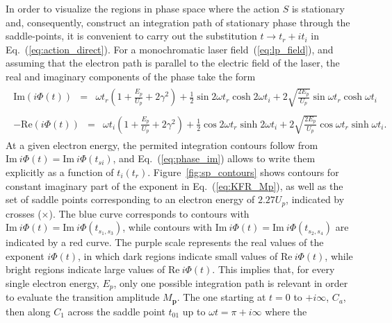 In order to visualize the regions in phase space where the action $S$
is stationary and, consequently, construct an integration path of
stationary phase through the saddle-points, it is convenient to carry
out the substitution $t \to t_{r} + it_{i}$ in
Eq.~(\ref{eq:action_direct}). For a monochromatic laser
field~(\ref{eq:lp_field}), and assuming that the electron path is
parallel to the electric field of the laser, the real and imaginary
components of the phase take the form~\cite{phd_Kopold}
%
\begin{eqnarray}
  \label{eq:phase_im}
  \begin{split}
    \mathrm{Im}(i\Phi(t)) & = & \omega t_{r} ( 1 + \frac{E_{p}}{U_{p}}
    + 2\gamma^{2} ) +
    \frac{1}{2} \sin 2\omega t_{r} \cosh 2\omega t_{i}
    + 2\sqrt{\frac{2E_{p}}{U_{p}}} \sin\omega t_{r} \cosh\omega t_{i}
  \end{split}
\end{eqnarray}
%
\begin{eqnarray}
  \label{eq:phase_re}
  \begin{split}
    -\mathrm{Re}(i\Phi(t)) & = & \omega t_{i} (
    1 + \frac{E_{p}}{U_{p}} + 2\gamma^{2} )
    + \frac{1}{2} \cos 2\omega t_{r} \sinh 2\omega t_{i}
    + 2\sqrt{\frac{2E_{p}}{U_{p}}} \cos\omega t_{r} \sinh\omega t_{i}.
  \end{split}
\end{eqnarray}
%
At a given electron energy, the permited integration contours follow
from $\mathrm{Im}\ i \Phi(t) = \mathrm{Im}\ i \Phi(t_{si})$, and
Eq.~(\ref{eq:phase_im}) allows to write them explicitly as a function
of $t_{i}(t_{r})$. Figure~\ref{fig:sp_contours} shows contours for
constant imaginary part of the exponent in Eq.~(\ref{eq:KFR_Mp}), as
well as the set of saddle points corresponding to an electron energy
of $2.27 U_{p}$, indicated by crosses ($\times$). The blue curve
corresponds to contours with $\mathrm{Im}\ i \Phi(t) = \mathrm{Im}\ i
\Phi(t_{s_{1},s_{3}})$, while contours with $\mathrm{Im}\ i \Phi(t) =
\mathrm{Im}\ i \Phi(t_{s_{2},s_{4}})$ are indicated by a red
curve. The purple scale represents the real values of the exponent
$i\Phi(t)$, in which dark regions indicate small values of
$\mathrm{Re}\ i\Phi(t)$, while bright regions indicate large values of
$\mathrm{Re}\ i\Phi(t)$. This implies that, for every single electron
energy, $E_{p}$, only one possible integration path is relevant in
order to evaluate the transition amplitude $M_{\mathbf{p}}$. The one
starting at $t = 0$ to $+i\infty$, $C_{a}$, then along $C_{1}$ across
the saddle point $t_{01}$ up to $\omega t = \pi + i\infty$ where the
